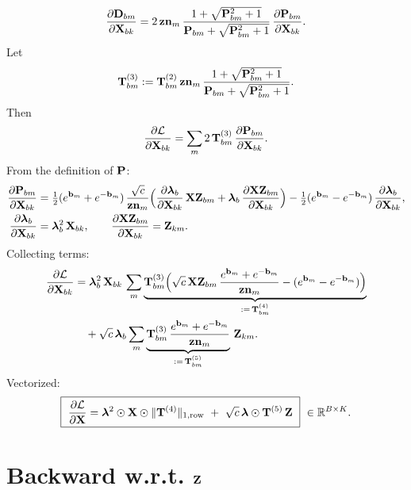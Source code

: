 \documentclass{article}
\begin{document}
\begin{align}
\ddfrac{\v{D}{bm}}{\v{X}{bk}}
= 2\,\v{zn}{m}\,\frac{1+\sqrt{\v{P}{bm}^2+1}}{\v{P}{bm}+\sqrt{\v{P}{bm}^2+1}}\,\ddfrac{\v{P}{bm}}{\v{X}{bk}}.
\end{align}
Let
\[
\T{3}{bm}:= \T{2}{bm}\,\v{zn}{m}\,\frac{1+\sqrt{\v{P}{bm}^2+1}}{\v{P}{bm}+\sqrt{\v{P}{bm}^2+1}}.
\]
Then
\begin{align}
\ddfrac{\mathcal{L}}{\v{X}{bk}}
= \sum_m 2\,\T{3}{bm}\,\ddfrac{\v{P}{bm}}{\v{X}{bk}}.
\end{align}
From the definition of $\v{P}$:
\begin{align}
\ddfrac{\v{P}{bm}}{\v{X}{bk}}
&= \tfrac12(\ev{b}{m}+\ev{-b}{m})\,\frac{\sqrt{c}}{\v{zn}{m}}
\Big(\ddfrac{\lam_b}{\v{X}{bk}}\,\v{XZ}{bm} + \lam_b\,\ddfrac{\v{XZ}{bm}}{\v{X}{bk}}\Big)
- \tfrac12(\ev{b}{m}-\ev{-b}{m})\,\ddfrac{\lam_b}{\v{X}{bk}},
\\
\ddfrac{\lam_b}{\v{X}{bk}} &= \lam_b^2\,\v{X}{bk},\qquad
\ddfrac{\v{XZ}{bm}}{\v{X}{bk}} = \v{Z}{km}.
\end{align}
Collecting terms:
\begin{align}
\ddfrac{\mathcal{L}}{\v{X}{bk}}
&= \lam_b^2\,\v{X}{bk}\,\sum_m \underbrace{\T{3}{bm}\Big(\sqrt{c}\,\v{XZ}{bm}\,\frac{\ev{b}{m}+\ev{-b}{m}}{\v{zn}{m}} - (\ev{b}{m}-\ev{-b}{m})\Big)}_{:=\,\T{4}{bm}} \\
&\quad + \sqrt{c}\,\lam_b \sum_m \underbrace{\T{3}{bm}\,\frac{\ev{b}{m}+\ev{-b}{m}}{\v{zn}{m}}}_{:=\,\T{5}{bm}}\,\v{Z}{km}.
\end{align}
Vectorized:
\[
\boxed{\ \ddfrac{\mathcal{L}}{\v{X}} = \v{\lam}^2 \had \v{X} \had \rownorm{\T{4}}\ +\ \sqrt{c}\,\v{\lam}\had \T{5}\,\v{Z}\ }\ \in\mathbb{R}^{B\times K}.
\]

\section{Backward w.r.t. $\v{Z}$}
\end{document}
